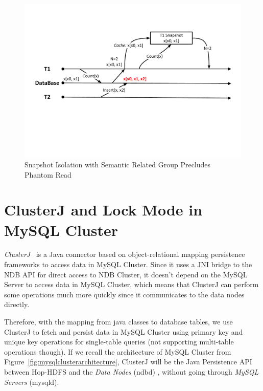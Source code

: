 \begin{itemize}[noitemsep]
	\begin{figure}[h]
		\centering
		\includegraphics[width=\linewidth]{figs/snapphantom.pdf}
		\caption{Snapshot Isolation with Semantic Related Group Precludes Phantom Read}
		\label{fig:snapphantom}
	\end{figure}
	
\end{itemize} 
  
\section{ClusterJ and Lock Mode in MySQL Cluster}

\textit{ClusterJ}~\cite{mysqlclusterj} is a Java connector based on object-relational mapping persistence frameworks to access data in MySQL Cluster. Since it uses a JNI bridge to the NDB API for direct access to NDB Cluster, it doesn't depend on the MySQL Server to access data in MySQL Cluster, which means that ClusterJ can perform some operations much more quickly since it communicates to the data nodes directly. 

\noindent Therefore, with the mapping from java classes to database tables, we use ClusterJ to fetch and persist data in MySQL Cluster using primary key and unique key operations for single-table queries (not supporting multi-table operations though). If we recall the architecture of MySQL Cluster from Figure~\ref{fig:mysqlclusterarchitecture}, ClusterJ will be the Java Persistence API between Hop-HDFS and the \textit{Data Nodes} (ndbd) , without going through \textit{MySQL Servers} (mysqld).

